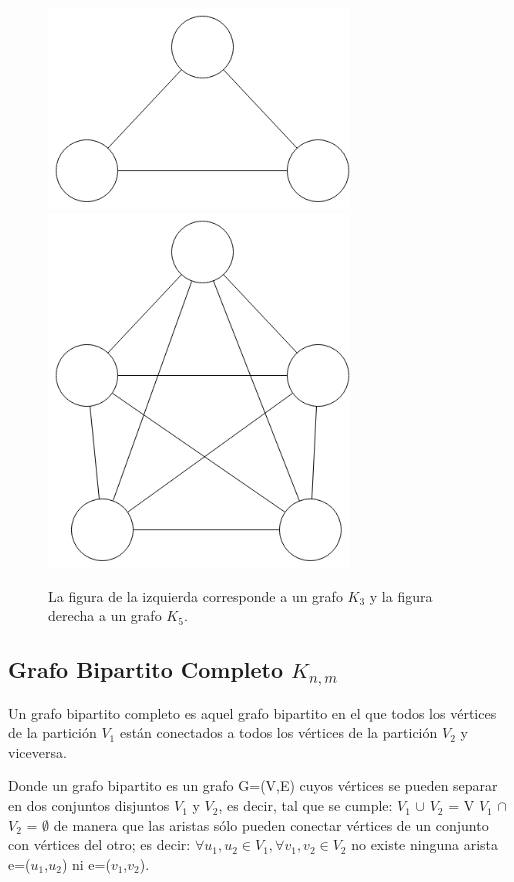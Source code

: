 \begin{figure}[H]
\includegraphics[width=80mm]{K3.png}
\includegraphics[width=80mm]{K5.png}
\caption{La figura de la izquierda corresponde a un grafo $K_3$ y la figura derecha a un grafo $K_5$.}
\label{overflow}
\end{figure}

\subsection{Grafo Bipartito Completo $K_{n,m}$}
Un grafo bipartito completo es aquel grafo bipartito en el que todos los vértices de la partición $V_1$ están conectados a todos los vértices de la partición $V_2$ y viceversa.

Donde un grafo bipartito es un grafo G=(V,E) cuyos vértices se pueden separar en dos conjuntos disjuntos $V_1$ y $V_2$, es decir, tal que se cumple:
$V_1$ $\cup$ $V_2$ = V
$V_1$ $\cap$ $V_2$ = $\emptyset$
de manera que las aristas sólo pueden conectar vértices de un conjunto con vértices del otro; es decir:
$\forall u_1, u_2 \in V_1, \forall v_1, v_2 \in V_2$ no existe ninguna arista e=($u_1$,$u_2$) ni e=($v_1$,$v_2$).

